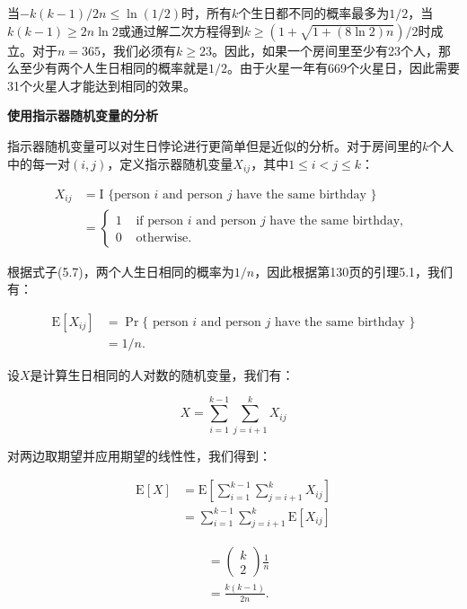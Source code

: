 \documentclass[lang=cn,newtx,10pt,scheme=chinese]{elegantbook}
\begin{document}
当$-k(k-1)/2n\leq \ln(1/2)$时，所有$k$个生日都不同的概率最多为$1/2$，当$k(k-1)\geq 2n\ln 2$或通过解二次方程得到$k\geq(1+\sqrt{1+(8\ln 2)n})/2$时成立。对于$n=365$，我们必须有$k\geq 23$。因此，如果一个房间里至少有23个人，那么至少有两个人生日相同的概率就是$1/2$。由于火星一年有669个火星日，因此需要31个火星人才能达到相同的效果。

\textbf{使用指示器随机变量的分析}

指示器随机变量可以对生日悖论进行更简单但是近似的分析。对于房间里的$k$个人中的每一对$(i,j)$，定义指示器随机变量$X_{ij}$，其中$1\leq i<j\leq k$：

$$
\begin{aligned}
X_{i j} & =\mathrm{I} \text { \{person } i \text { and person } j \text { have the same birthday }\} \\
& = \begin{cases}1 & \text { if person } i \text { and person } j \text { have the same birthday, } \\
0 & \text { otherwise. }\end{cases}
\end{aligned}
$$

根据式子(5.7)，两个人生日相同的概率为$1/n$，因此根据第130页的引理5.1，我们有：

$$
\begin{aligned}
\mathrm{E}\left[X_{i j}\right] & =\operatorname{Pr}\{\text { person } i \text { and person } j \text { have the same birthday }\} \\
& =1 / n .
\end{aligned}
$$

设$X$是计算生日相同的人对数的随机变量，我们有：

$$
X=\sum_{i=1}^{k-1} \sum_{j=i+1}^k X_{i j}
$$

对两边取期望并应用期望的线性性，我们得到：

$$
\begin{aligned}
\mathrm{E}[X] & =\mathrm{E}\left[\sum_{i=1}^{k-1} \sum_{j=i+1}^k X_{i j}\right] \\
& =\sum_{i=1}^{k-1} \sum_{j=i+1}^k \mathrm{E}\left[X_{i j}\right]
\end{aligned}
$$

$$
\begin{aligned}
& =\left(\begin{array}{l}
k \\
2
\end{array}\right) \frac{1}{n} \\
& =\frac{k(k-1)}{2 n} .
\end{aligned}
$$
\end{document}
